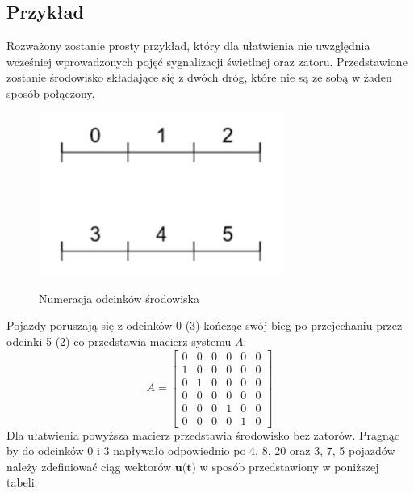 \documentclass[12pt]{book}
\theoremstyle{plain}
\begin{document}
\subsection{Przykład}
Rozważony zostanie prosty przykład, który dla ułatwienia nie uwzględnia wcześniej wprowadzonych pojęć sygnalizacji świetlnej oraz zatoru. Przedstawione zostanie środowisko składające się z dwóch dróg, które nie są ze sobą w żaden sposób połączony.
\begin{figure}[H]
	\centering
	\includegraphics[width=8cm]{images/env_12}
	\label{fig:env_12}
	\caption{Numeracja odcinków środowiska}
\end{figure} \noindent
Pojazdy poruszają się z odcinków 0 (3) kończąc swój bieg po przejechaniu przez odcinki 5 (2) co przedstawia macierz systemu $A$:
\def \A{\begin{bmatrix}
0 & 0 & 0 & 0 & 0 & 0 \\
1 & 0 & 0 & 0 & 0 & 0 \\
0 & 1 & 0 & 0 & 0 & 0 \\
0 & 0 & 0 & 0 & 0 & 0 \\
0 & 0 & 0 & 1 & 0 & 0 \\
0 & 0 & 0 & 0 & 1 & 0
\end{bmatrix}}
\[A=\A \]
Dla ułatwienia powyższa macierz przedstawia środowisko bez zatorów.
Pragnąc by do odcinków 0 i 3  napływało odpowiednio po 4, 8, 20 oraz 3, 7, 5 pojazdów należy zdefiniować ciąg wektorów $\textbf{u(t)}$ w sposób przedstawiony w poniższej tabeli.
\end{document}
